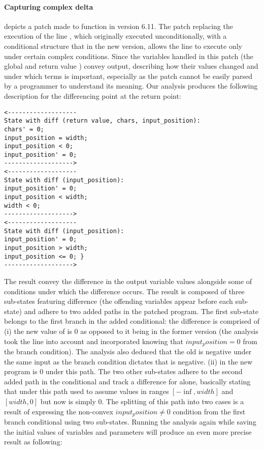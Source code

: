 \paragraph{Capturing complex delta}
 depicts a patch made to  function in version 6.11. The patch replacing the execution of the line , which originally executed unconditionally, with a conditional structure that in the new version, allows the line to execute only under certain complex conditions. Since the variables handled in this patch (the global  and return value ) convey output, describing how their values changed and under which terms is important, especially as the patch cannot be easily parsed by a programmer to understand its meaning. Our analysis produces the following description for the differencing point at the return point:
\begin{lstlisting}
<-------------------
State with diff (return value, chars, input_position):
chars' = 0;
input_position = width;
input_position < 0;
input_position' = 0;
------------------->
<-------------------
State with diff (input_position):
input_position' = 0;
input_position < width;
width < 0;
------------------->
<-------------------
State with diff (input_position):
input_position' = 0;
input_position > width;
input_position <= 0; }
------------------->
\end{lstlisting}
The result convey the difference in the output variable values alongside some of conditions under which the difference occurs. The result is composed of three sub-states featuring difference (the offending variables appear before each sub-state) and adhere to two added paths in the patched program. The first sub-state belongs to the first branch in the added conditional: the difference is comprised of (i) the new value of  is 0 as opposed to it being  in the former version (the analysis took the  line into account and incorporated knowing that $input_position = 0$ from the branch condition). The analysis also deduced that the old  is negative under the same input as the branch condition dictates that  is negative. (ii)  in the new program is 0 under this path. The two other sub-states adhere to the second added path in the conditional and track a difference for  alone, basically stating that  under this path used to assume values in ranges $[-\inf,width]$ and $[width,0]$ but now is simply 0. The splitting of this path into two cases is a result of expressing the non-convex $input_position \neq 0$ condition from the first branch conditional using two sub-states. Running the analysis again while saving the initial values of variables and parameters will produce an even more precise result as following:
